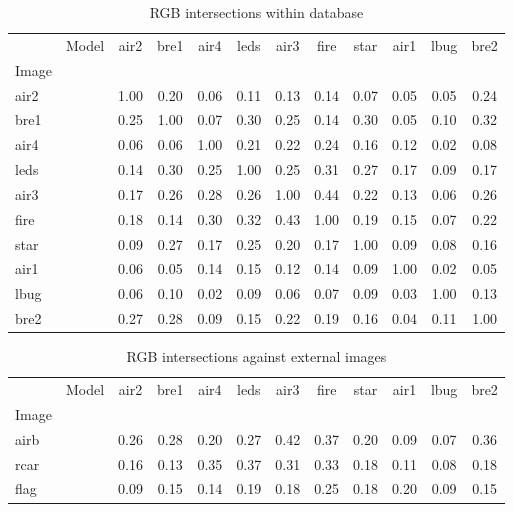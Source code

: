 \documentclass[abstract=true]{scrartcl}
\begin{document}
\begin{table}
    \begin{tabular}{l l | *{10}{c}}

              &Model&air2&bre1&air4&leds&air3&fire&star&air1&lbug&bre2\\  
        Image &     &    &    &    &    &    &    &    &    &    &    \\ 
        \hline
        air2  &     &1.00&0.20&0.06&0.11&0.13&0.14&0.07&0.05&0.05&0.24\\  
        bre1  &     &0.25&1.00&0.07&0.30&0.25&0.14&0.30&0.05&0.10&0.32\\  
        air4  &     &0.06&0.06&1.00&0.21&0.22&0.24&0.16&0.12&0.02&0.08\\  
        leds  &     &0.14&0.30&0.25&1.00&0.25&0.31&0.27&0.17&0.09&0.17\\  
        air3  &     &0.17&0.26&0.28&0.26&1.00&0.44&0.22&0.13&0.06&0.26\\  
        fire  &     &0.18&0.14&0.30&0.32&0.43&1.00&0.19&0.15&0.07&0.22\\  
        star  &     &0.09&0.27&0.17&0.25&0.20&0.17&1.00&0.09&0.08&0.16\\  
        air1  &     &0.06&0.05&0.14&0.15&0.12&0.14&0.09&1.00&0.02&0.05\\  
        lbug  &     &0.06&0.10&0.02&0.09&0.06&0.07&0.09&0.03&1.00&0.13\\  
        bre2  &     &0.27&0.28&0.09&0.15&0.22&0.19&0.16&0.04&0.11&1.00

    \end{tabular}
    \caption{RGB intersections within database}
\end{table}

\begin{table}
    \begin{tabular}{l l | *{10}{c}}

              &Model&air2&bre1&air4&leds&air3&fire&star&air1&lbug&bre2\\  
        Image &     &    &    &    &    &    &    &    &    &    &    \\  
        \hline
        airb  &     &0.26&0.28&0.20&0.27&0.42&0.37&0.20&0.09&0.07&0.36\\  
        rcar  &     &0.16&0.13&0.35&0.37&0.31&0.33&0.18&0.11&0.08&0.18\\  
        flag  &     &0.09&0.15&0.14&0.19&0.18&0.25&0.18&0.20&0.09&0.15

    \end{tabular}
    \caption{RGB intersections against external images}
\end{table}
\end{document}
